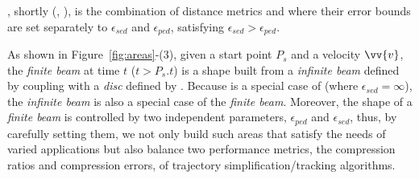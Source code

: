 , shortly \bed (\sed, \ped), is the combination of distance metrics \sed and \ped where their error bounds are set separately to $\epsilon_{sed}$ and $\epsilon_{ped}$, satisfying $\epsilon_{sed} > \epsilon_{ped}$. 


%
%

As shown in {Figure~\ref{fig:areas}-(3)}, given a start point $P_s$ and a velocity $\vv{v}$, the \emph{finite beam} at time $t$ ($t>P_s.t$) is a shape built from a \emph{infinite beam} defined by \ped coupling with a \emph{disc} defined by \sed.
Because \ped is a special case of \bed (where $\epsilon_{sed}=\infty$), the \emph{infinite beam} is also a special case of the \emph{finite beam}. Moreover, the shape of a \emph{finite beam} is controlled by two independent parameters, $\epsilon_{ped}$ and $\epsilon_{sed}$, thus, by carefully setting them, we not only build such areas that satisfy the needs of varied applications but also balance two performance metrics, the compression ratios and compression errors, of trajectory simplification/tracking algorithms. 



